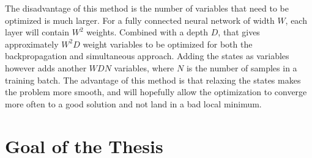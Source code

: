 The disadvantage of this method is the number of variables that need to be optimized is much larger. For a fully connected neural network of width $W$, each layer will contain $W^2$ weights. Combined with a depth $D$, that gives approximately $W^2D$ weight variables to be optimized for both the backpropagation and simultaneous approach. Adding the states as variables however adds another $WDN$ variables, where $N$ is the number of samples in a training batch. The advantage of this method is that relaxing the states makes the problem more smooth, and will hopefully allow the optimization to converge more often to a good solution and not land in a bad local minimum.

\section{Goal of the Thesis}



